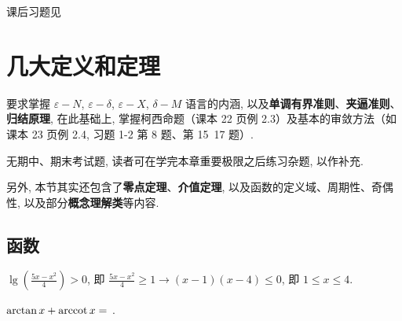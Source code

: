 
\begin{flushright}
  \faHandPointRight[regular] 课后习题见 
\end{flushright}

\setcounter{section}{-1}
\section{几大定义和定理}

\begin{knowledge}
  要求掌握 $\varepsilon-N$, $\varepsilon - \delta$, $\varepsilon - X$, $\delta - M$ 语言的内涵,
  以及\textbf{单调有界准则}、\textbf{夹逼准则}、\textbf{归结原理},
  在此基础上,
  掌握柯西命题（课本 22 页例 2.3）及基本的审敛方法（如课本 23 页例 2.4,
  习题 1-2 第 8 题、第 15~17 题）.

  无期中、期末考试题,
  读者可在学完本章重要极限之后练习杂题,
  以作补充.

  另外,
  本节其实还包含了\textbf{零点定理}、\textbf{介值定理}, 以及函数的定义域、周期性、奇偶性,
  以及部分\textbf{概念理解类}等内容.
\end{knowledge}

\subsection{函数}


\begin{analysis}
  $\lg \left( \right) >0$,
  即 $   \to (x-1)(x-4) $,
  即 $1 \leq x $.
\end{analysis}

\begin{question}
  $\arctan x+\arccot x =$
  \fillin[$$].
\end{question}

